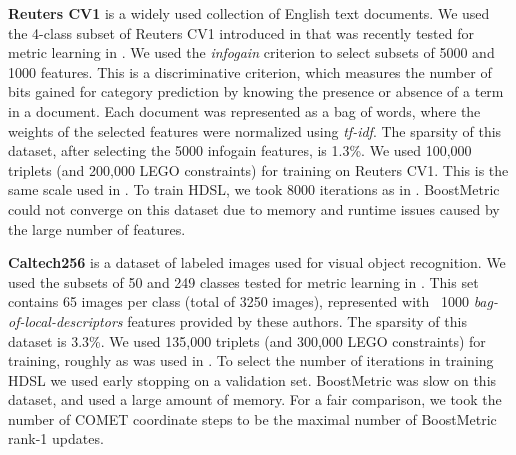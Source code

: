 \documentclass[twoside,11pt]{article}
\begin{document}
\textbf{Reuters CV1} is a widely used collection of English text documents. We used the 4-class subset of Reuters CV1 introduced in \citep{CaiRCV14} that was recently tested for metric learning in \citep{hdsl}. We used the \textit{infogain} criterion \citep{infogain} to select subsets of 5000 and 1000 features. This is a discriminative criterion, which measures the number of bits gained for category prediction by knowing the presence or absence of a term in a document. Each document was represented as a bag of words, where the weights of the selected features were normalized using \textit{tf-idf}. The sparsity of this dataset, after selecting the 5000 infogain features, is 1.3\%. We used 100,000 triplets (and 200,000 LEGO constraints) for training on Reuters CV1. This is the same scale used in \citet{hdsl}. To train HDSL, we took 8000 iterations as in \citep{hdsl}. BoostMetric could not converge on this dataset due to memory and runtime issues caused by the large number of features.

\textbf{Caltech256} is a dataset of labeled images used for visual object recognition. We used the subsets of 50 and 249 classes tested for metric learning in \citep{OASIS}. This set contains 65 images per class (total of 3250 images), represented with ~1000 \textit{bag-of-local-descriptors} features provided by these authors. The sparsity of this dataset is 3.3\%. We used 135,000 triplets (and 300,000 LEGO constraints) for training, roughly as was used in \citep{OASIS}. To select the number of iterations in training HDSL we used early stopping on a validation set. BoostMetric was slow on this dataset, and used a large amount of memory. For a fair comparison, we took the number of COMET coordinate steps to be the maximal number of BoostMetric rank-1 updates.
\end{document}
